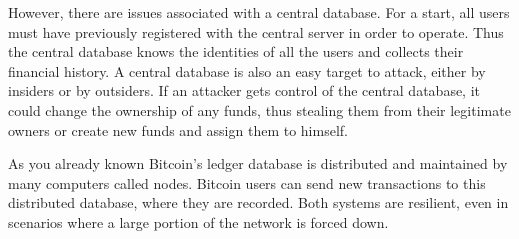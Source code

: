 \documentclass{article}
\begin{document}
\noindent However, there are issues associated with a central database. For a start, all users must have previously registered with the central server in order to operate. Thus the central database knows the identities of all the users and collects their financial history. A central database is also an easy target to attack, either by insiders or by outsiders. If an attacker gets control of the central database, it could change the ownership of any funds, thus stealing them from their legitimate owners or create new funds and assign them to himself. \par
\noindent As you already known Bitcoin’s ledger database is distributed and maintained by many computers called nodes. Bitcoin users can send new transactions to this distributed database, where they are recorded. Both systems are resilient, even in scenarios where a large portion of the network is forced down.
\end{document}
